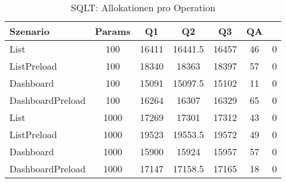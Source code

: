 \begin{table}[ht]
\centering
\caption{SQLT: Allokationen pro Operation}
\begin{tabular}{lccccc}
\toprule
Szenario & Params & Q1 & Q2 & Q3 & QA \\
\midrule
	List & 100 & 16411 & 16441.5 & 16457 & 46 & 0 \\
	ListPreload & 100 & 18340 & 18363 & 18397 & 57 & 0 \\
	Dashboard & 100 & 15091 & 15097.5 & 15102 & 11 & 0 \\
	DashboardPreload & 100 & 16264 & 16307 & 16329 & 65 & 0 \\
	List & 1000 & 17269 & 17301 & 17312 & 43 & 0 \\
	ListPreload & 1000 & 19523 & 19553.5 & 19572 & 49 & 0 \\
	Dashboard & 1000 & 15900 & 15924 & 15957 & 57 & 0 \\
	DashboardPreload & 1000 & 17147 & 17158.5 & 17165 & 18 & 0 \\
\bottomrule
\end{tabular}
\label{tab:benchmark_sqlt_allocsperop}
\end{table}
	